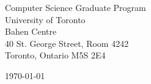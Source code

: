 \begin{minipage}{0.49\textwidth}
\begin{flushleft}
\noindent
Computer Science Graduate Program\\
University of Toronto\\
Bahen Centre\\
40 St. George Street, Room 4242\\
Toronto, Ontario M5S 2E4
\end{flushleft}
\end{minipage}
\begin{minipage}{0.47\textwidth}
\begin{flushright}
\today
\end{flushright}
\end{minipage} \\

\newcommand{\univ}{University of Toronto}
\newcommand{\univshort}{UT}
\newcommand{\degree}{Ph.D.}
\newcommand{\dept}{Computer Science}
